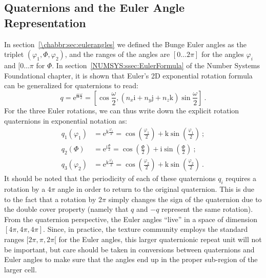 \subsection{Quaternions and the Euler Angle Representation}\label{\chabbr:sec:quateuler}

In section~\ref{\chabbr:sec:eulerangles} we defined the Bunge Euler angles as the triplet $(\varphi_1,\Phi,\varphi_2)$, and the ranges of the angles are $[0\ldots 2\pi]$ for the angles $\varphi_i$ and $[0\ldots \pi$ for $\Phi$.  In section~\ref{NUMSYS:ssec:EulerFormula} of the Number Systems Foundational chapter, it is shown that Euler's 2D exponential rotation formula can be generalized for quaternions to read:
\begin{equation}
	q = \mathrm{e}^{\hat{\mathbf{n}}\frac{\omega}{2}} = \left[\cos\frac{\omega}{2},(n_x\mathrm{i}+n_y \mathrm{j}+n_z \mathrm{k})\sin\frac{\omega}{2}\right]\ .\label{\chabbr:eq:quatrot}
\end{equation}
For the three Euler rotations, we can thus write down the explicit rotation quaternions in exponential notation as:
\begin{equation}
\begin{split}
	q_1(\varphi_1) &= \mathrm{e}^{\mathrm{k}\frac{\varphi_1}{2}} = \cos\left(\frac{\varphi_1}{2}\right) + \mathrm{k} \sin\left(\frac{\varphi_1}{2}\right)\ ;\\
	q_2(\Phi) &= \mathrm{e}^{\mathrm{i}\frac{\Phi}{2}} = \cos\left(\frac{\Phi}{2}\right) + \mathrm{i} \sin\left(\frac{\Phi}{2}\right)\ ;\\
	q_3(\varphi_2) &= \mathrm{e}^{\mathrm{k}\frac{\varphi_2}{2}} = \cos\left(\frac{\varphi_2}{2}\right) + \mathrm{k} \sin\left(\frac{\varphi_2}{2}\right)\ .
\end{split}
\end{equation}
It should be noted that the periodicity of each of these quaternions $q_i$ requires a rotation by a $4\pi$ angle in order to return to the original quaternion. This is due to the fact that a rotation by $2\pi$ simply changes the sign of the quaternion due to the double cover property (namely that $q$ and $-q$ represent the same rotation).  From the quaternion perspective, the Euler angles ``live'' in a space of dimension $[4\pi,4\pi,4\pi]$. Since, in practice, the texture community employs the standard ranges $[2\pi,\pi,2\pi[$ for the Euler angles, this larger quaternionic repeat unit will not be important, but care should be taken in conversions between quaternions and Euler angles to make sure that the angles end up in the proper sub-region of the larger cell.



